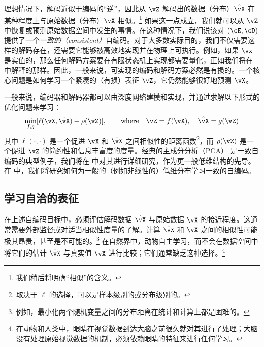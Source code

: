 \documentclass[../../book-main_zh.tex]{subfiles}
\begin{document}
理想情况下，解码近似于编码的“逆”，因此从 \(\vZ\) 解码出的数据（分布）\(\hat{\vX}\)
在某种程度上与原始数据（分布）\(\vX\) 相似。\footnote{我们稍后将明确“相似”的含义。} 如果这一点成立，我们就可以从
\(\vZ\) 中恢复或预测原始数据空间中发生的事情。在这种情况下，我们说该对 \((\cE, \cD)\)
提供了一个\textit{一致的（consistent）}自编码。对于大多数实际目的，我们不仅需要这样的解码存在，还需要它能够被高效地实现并在物理上可执行。例如，如果
\(\vx\) 是实值的，那么任何解码方案要在有限状态机上实现都需要量化，正如我们将在
中解释的那样。因此，一般来说，可实现的编码和解码方案必然是有损的。一个核心问题是如何学习一个紧凑的（有损）表征
\(\vZ\)，它仍然能够很好地预测 \(\vX\)。

一般来说，编码器和解码器都可以由深度网络建模和实现，并通过求解以下形式的优化问题来学习：
\begin{equation}
    \min_{f, g} [\ell(\vX, \hat{\vX}) + \rho(\vZ)], \qquad
    \text{where} \quad \vZ = f(\vX), \quad \hat{\vX} = g(\vZ)
    \label{eqn:auto-encoding-objective}
\end{equation}
其中 \(\ell(\cdot, \cdot)\) 是一个促进 \(\vX\) 和 \(\hat{\vX}\)
之间相似性的距离函数\footnote{取决于 \(\ell\) 的选择，可以是样本级别的或分布级别的。}，而 \(\rho(\vZ)\)
是一个促进 \(\vZ\) 的简约性和信息丰富度的度量。经典的主成分分析（PCA）\cite{JolliffeI2002}
是一致自编码的典型例子，我们将在  中对其进行详细研究，作为更一般低维结构的先导。在
 中，我们将研究如何为一般的（例如非线性的）低维分布学习一致的自编码。

\subsection{学习自洽的表征}
在上述自编码目标中，必须评估解码数据 \(\hat{\vX}\) 与原始数据 \(\vX\)
的接近程度。这通常需要外部监督或对适当相似性度量的了解。计算 \(\hat{\vX}\) 和 \(\vX\)
之间的相似性可能极其昂贵，甚至是不可能的。\footnote{例如，最小化两个随机变量之间的分布距离在统计和计算上都是困难的。}
在自然界中，动物自主学习，而不会在数据空间中将它们的估计 \(\hat{\vX}\) 与真实值 \(\vX\)
进行比较；它们通常缺乏这种选择。\footnote{在动物和人类中，眼睛在视觉数据到达大脑之前很久就对其进行了处理；大脑没有处理原始视觉数据的机制，必须依赖眼睛的特征来进行任何学习。}
\end{document}
